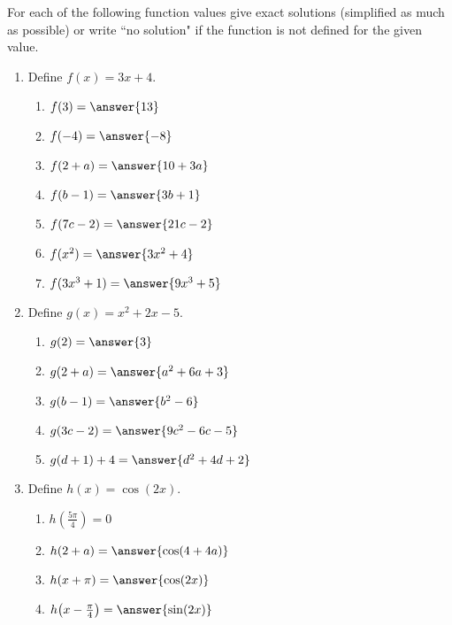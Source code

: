 \documentclass{ximera}
\author{Elizabeth Campolongo}
\begin{document}
\begin{exercise}
For each of the following function values give exact solutions (simplified as much as possible) or write ``no solution" if the function is not defined for the given value.
%
\begin{enumerate}
%
\item Define $f(x)= 3x+4.$
\begin{enumerate}
\item $f(3) = \answer{13}$

\item $f(-4) = \answer{-8}$

\item $f(2+a)=\answer{10+3a}$

\item $f(b-1) = \answer{3b+1}$

\item $f(7c-2) = \answer{21c-2}$

\item $f(x^2) = \answer{3x^2+4}$

\item $f(3x^3+1) = \answer{9x^3 +5}$
\end{enumerate}

\item Define $g(x)= x^2+2x-5.$
\begin{enumerate}
\item $g(2) = \answer{3}$

\item $g(2+a)=\answer{a^2+6a+3}$

\item $g(b-1) = \answer{b^2-6}$

\item $g(3c-2) = \answer{9c^2-6c-5}$

\item $g(d+1)+4 = \answer{d^2+4d+2}$
\end{enumerate}


\item Define $h(x)= \cos(2x).$
\begin{enumerate}
\item $h\!\left(\frac{5\pi}{4}\right) = 0$

\item $h(2+a)=\answer{\cos(4+4a)}$

\item $h(x+\pi) = \answer{\cos(2x)}$

\item $h\!\left(x-\frac{\pi}{4}\right) = \answer{\sin(2x)}$


\end{enumerate}
\end{enumerate}
\end{exercise}
\end{document}
